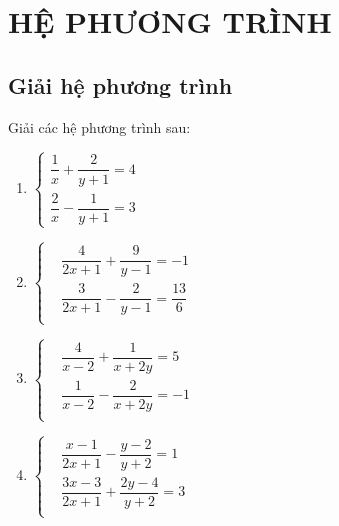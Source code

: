 \chapter{HỆ PHƯƠNG TRÌNH}

\section{Giải hệ phương trình}

\begin{bt}
	Giải các hệ phương trình sau:
	\begin{multicols}{2}
		\begin{enumerate}
			\item $\begin{cases} \dfrac{1}{x} + \dfrac{2}{y + 1} = 4\\ \dfrac{2}{x} - \dfrac{1}{y + 1} = 3 \end{cases}$
			\item $\left\{ \begin{aligned}
			& \dfrac{4}{2x+1}+\dfrac{9}{y-1}=-1 \\ 
			& \dfrac{3}{2x+1}-\dfrac{2}{y-1}=\dfrac{13}{6} \\ 
			\end{aligned} \right.$
			\item $\left\{ \begin{aligned}
			& \dfrac{4}{x-2}+\dfrac{1}{x+2y}=5 \\ 
			& \dfrac{1}{x-2}-\dfrac{2}{x+2y}=-1 \\ 
			\end{aligned} \right.$
			\item $\left\{ \begin{aligned}
			& \dfrac{x-1}{2x+1}-\dfrac{y-2}{y+2}=1 \\ 
			& \dfrac{3x-3}{2x+1}+\dfrac{2y-4}{y+2}=3 \\ 
			\end{aligned} \right.$
		\end{enumerate}
	\end{multicols}
\end{bt}
